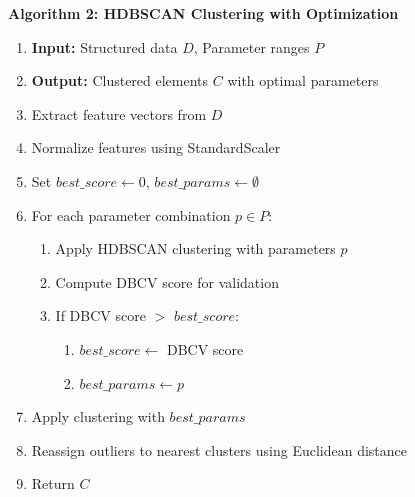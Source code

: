 
\textbf{Algorithm 2: HDBSCAN Clustering with Optimization}
\begin{enumerate}
\item \textbf{Input:} Structured data $D$, Parameter ranges $P$
\item \textbf{Output:} Clustered elements $C$ with optimal parameters
\item Extract feature vectors from $D$
\item Normalize features using StandardScaler
\item Set $best\_score \gets 0$, $best\_params \gets \emptyset$
\item For each parameter combination $p \in P$:
\begin{enumerate}
    \item Apply HDBSCAN clustering with parameters $p$
    \item Compute DBCV score for validation
    \item If DBCV score $>$ $best\_score$:
    \begin{enumerate}
        \item $best\_score \gets$ DBCV score
        \item $best\_params \gets p$
    \end{enumerate}
\end{enumerate}
\item Apply clustering with $best\_params$
\item Reassign outliers to nearest clusters using Euclidean distance
\item Return $C$
\end{enumerate}

